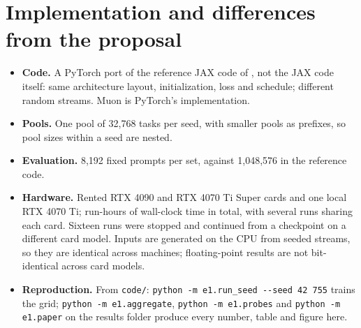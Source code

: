 \documentclass[11pt]{article}
\begin{document}
\section{Implementation and differences from the proposal}

\begin{itemize}\setlength{\itemsep}{1pt}
\item \textbf{Code.} A PyTorch port of the reference JAX code of \citet{raventos2023}, not the JAX code itself: same architecture layout, initialization, loss and schedule; different random streams. Muon is PyTorch's implementation.
\item \textbf{Pools.} One pool of 32{,}768 tasks per seed, with smaller pools as prefixes, so pool sizes within a seed are nested.
\item \textbf{Evaluation.} 8{,}192 fixed prompts per set, against 1{,}048{,}576 in the reference code.
\item \textbf{Hardware.} Rented RTX 4090 and RTX 4070 Ti Super cards and one local RTX 4070 Ti; \RunHours{} run-hours of wall-clock time in total, with several runs sharing each card. Sixteen runs were stopped and continued from a checkpoint on a different card model. Inputs are generated on the CPU from seeded streams, so they are identical across machines; floating-point results are not bit-identical across card models.
\item \textbf{Reproduction.} From \texttt{code/}: \texttt{python -m e1.run\_seed -{}-seed 42 755} trains the grid; \texttt{python -m e1.aggregate}, \texttt{python -m e1.probes} and \texttt{python -m e1.paper} on the results folder produce every number, table and figure here.
\end{itemize}
\end{document}
